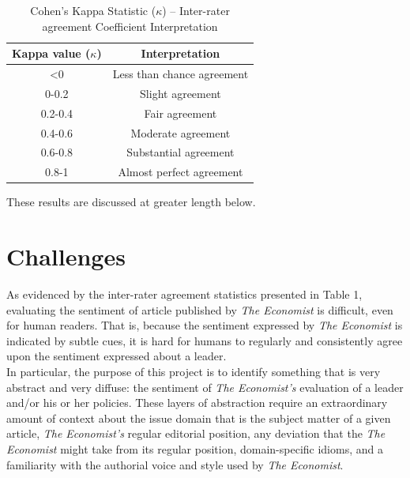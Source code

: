 \documentclass[11pt, letterpaper, twoside]{article}
\begin{document}
        \begin{table}[ht]
                \centering
                \caption{Cohen's Kappa Statistic ($\kappa$) -- Inter-rater agreement Coefficient Interpretation}
                    \begin{tabular}{@{}cc@{}}
                        \toprule
                        \multicolumn{1}{c}{\textbf{Kappa value ($\kappa$)}} & \multicolumn{1}{c}{\textbf{Interpretation}} \\ \midrule
                        \textless{}0 & Less than chance agreement \\
                        0-0.2        & Slight agreement           \\
                        0.2-0.4      & Fair agreement             \\
                        0.4-0.6      & Moderate agreement         \\
                        0.6-0.8      & Substantial agreement      \\
                        0.8-1        & Almost perfect agreement   \\ \bottomrule
                        \end{tabular}
        \end{table}

        These results are discussed at greater length below.

\section{Challenges}
    As evidenced by the inter-rater agreement statistics presented in Table 1, evaluating the sentiment of article published by \textit{The Economist} is difficult, even for human readers. That is, because the sentiment expressed by \textit{The Economist} is indicated by subtle cues, it is hard for humans to regularly and consistently agree upon the sentiment expressed about a leader.\\

    In particular, the purpose of this project is to identify something that is very abstract and very diffuse: the sentiment of \textit{The Economist's} evaluation of a leader and/or his or her policies. These layers of abstraction require an extraordinary amount of context about the issue domain that is the subject matter of a given article, \textit{The Economist's} regular editorial position, any deviation that the \textit{The Economist} might take from its regular position, domain-specific idioms, and a familiarity with the authorial voice and style used by \textit{The Economist}.\\
\end{document}
